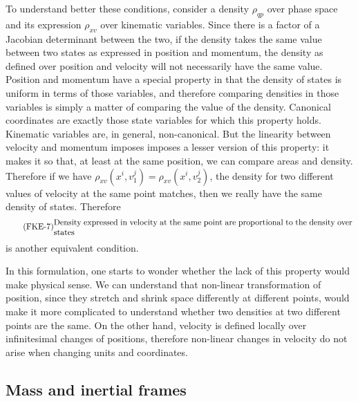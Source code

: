 To understand better these conditions, consider a density $\rho_{qp}$ over phase space and its expression $\rho_{xv}$ over kinematic variables. Since there is a factor of a Jacobian determinant between the two, if the density takes the same value between two states as expressed in position and momentum, the density as defined over position and velocity will not necessarily have the same value. Position and momentum have a special property in that the density of states is uniform in terms of those variables, and therefore comparing densities in those variables is simply a matter of comparing the value of the density. Canonical coordinates are exactly those state variables for which this property holds. Kinematic variables are, in general, non-canonical. But the linearity between velocity and momentum imposes imposes a lesser version of this property: it makes it so that, at least at the same position, we can compare areas and density. Therefore if we have $\rho_{xv}(x^i, v_1^j) = \rho_{xv}(x^i, v_2^j)$, the density for two different values of velocity at the same point matches, then we really have the same density of states. Therefore
\begin{equation}
	\tag{FKE-7}\label{rp-cm-fke-condDensityVelocity}
	\parbox{5in}{Density expressed in velocity at the same point are proportional to the density over states}
\end{equation}
is another equivalent condition.

In this formulation, one starts to wonder whether the lack of this property would make physical sense. We can understand that non-linear transformation of position, since they stretch and shrink space differently at different points, would make it more complicated to understand whether two densities at two different points are the same. On the other hand, velocity is defined locally over infinitesimal changes of positions, therefore non-linear changes in velocity do not arise when changing units and coordinates.

\subsection{Mass and inertial frames}


